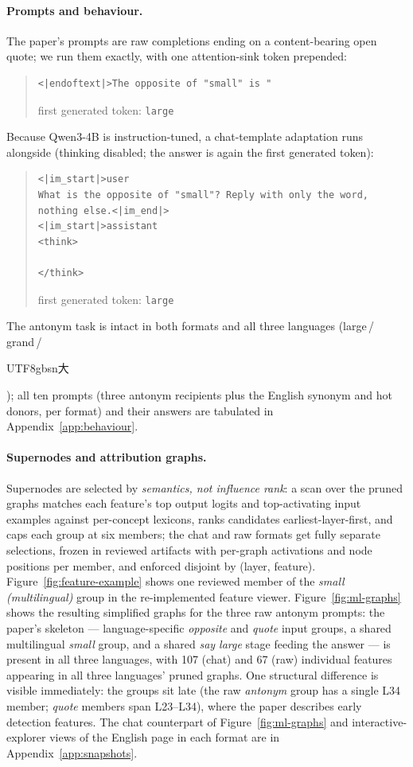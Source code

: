 \documentclass[11pt,a4paper]{article}
\newcommand{\zh}[1]{\begin{CJK}{UTF8}{gbsn}#1\end{CJK}}
\begin{document}
\paragraph{Prompts and behaviour.}
The paper's prompts are raw completions ending on a content-bearing open quote; we run
them exactly, with one attention-sink token prepended:
\begin{quote}\small
\begin{verbatim}
<|endoftext|>The opposite of "small" is "
\end{verbatim}
\vspace{-0.6\baselineskip}
first generated token: \texttt{large}
\end{quote}
Because Qwen3-4B is instruction-tuned, a chat-template adaptation runs alongside
(thinking disabled; the answer is again the first generated token):
\begin{quote}\small
\begin{verbatim}
<|im_start|>user
What is the opposite of "small"? Reply with only the word,
nothing else.<|im_end|>
<|im_start|>assistant
<think>

</think>

\end{verbatim}
\vspace{-0.6\baselineskip}
first generated token: \texttt{large}
\end{quote}
The antonym task is intact in both formats and all three languages
(large\,/\,grand\,/\,\zh{大}); all ten prompts (three antonym recipients plus the
English synonym and hot donors, per format) and their answers are tabulated in
Appendix~\ref{app:behaviour}.

\paragraph{Supernodes and attribution graphs.}
Supernodes are selected by \emph{semantics, not influence rank}: a scan over the
pruned graphs matches each feature's top output logits and top-activating input
examples against per-concept lexicons, ranks candidates earliest-layer-first, and
caps each group at six members; the chat and raw formats get fully separate
selections, frozen in reviewed artifacts with per-graph activations and node
positions per member, and enforced disjoint by (layer, feature).
Figure~\ref{fig:feature-example} shows one reviewed member of the
\emph{small (multilingual)} group in the re-implemented feature viewer.
Figure~\ref{fig:ml-graphs} shows the resulting simplified graphs
for the three raw antonym prompts: the paper's skeleton --- language-specific
\emph{opposite} and \emph{quote} input groups, a shared multilingual \emph{small}
group, and a shared \emph{say large} stage feeding the answer --- is present in all
three languages, with 107 (chat) and 67 (raw) individual features appearing in all
three languages' pruned graphs. One structural difference is visible immediately: the
groups sit late (the raw \emph{antonym} group has a single L34 member; \emph{quote}
members span L23--L34), where the paper describes early detection features. The chat
counterpart of Figure~\ref{fig:ml-graphs} and interactive-explorer views of the
English page in each format are in Appendix~\ref{app:snapshots}.
\end{document}
